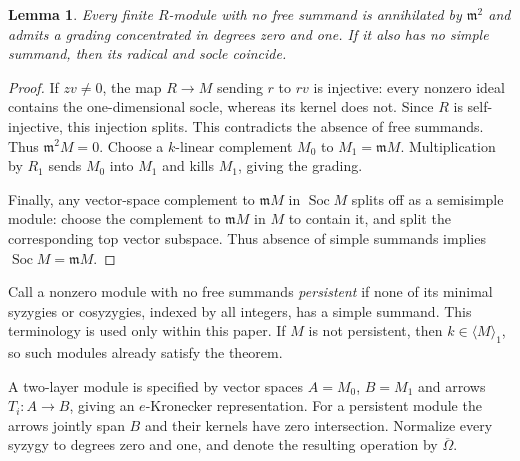 \documentclass[11pt]{article}
\newtheorem{lemma}[theorem]{Lemma}
\theoremstyle{definition}\newtheorem{definition}[theorem]{Definition}
\theoremstyle{remark}\newtheorem{remark}[theorem]{Remark}
\newcommand{\m}{\mathfrak m}
\newcommand{\Soc}{\operatorname{Soc}}
\newcommand{\Om}{\overline\Omega}
\begin{document}
\begin{lemma}\label{lem:layers}
Every finite $R$-module with no free summand is annihilated by $\m^2$ and admits a grading concentrated in degrees zero and one. If it also has no simple summand, then its radical and socle coincide.
\end{lemma}
\begin{proof}
If $zv\ne0$, the map $R\to M$ sending $r$ to $rv$ is injective: every nonzero ideal contains the one-dimensional socle, whereas its kernel does not. Since $R$ is self-injective, this injection splits. This contradicts the absence of free summands. Thus $\m^2M=0$. Choose a $k$-linear complement $M_0$ to $M_1=\m M$. Multiplication by $R_1$ sends $M_0$ into $M_1$ and kills $M_1$, giving the grading.

Finally, any vector-space complement to $\m M$ in $\Soc M$ splits off as a semisimple module: choose the complement to $\m M$ in $M$ to contain it, and split the corresponding top vector subspace. Thus absence of simple summands implies $\Soc M=\m M$.
\end{proof}

Call a nonzero module with no free summands \emph{persistent} if none of its minimal syzygies or cosyzygies, indexed by all integers, has a simple summand. This terminology is used only within this paper. If $M$ is not persistent, then $k\in\langle M\rangle_1$, so such modules already satisfy the theorem.

A two-layer module is specified by vector spaces $A=M_0$, $B=M_1$ and arrows $T_i:A\to B$, giving an $e$-Kronecker representation. For a persistent module the arrows jointly span $B$ and their kernels have zero intersection. Normalize every syzygy to degrees zero and one, and denote the resulting operation by $\Om$.
\end{document}
